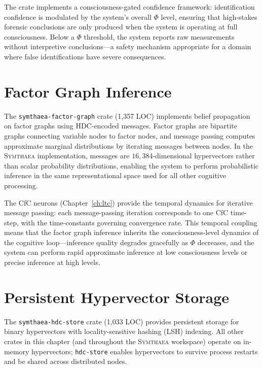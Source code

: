 \documentclass[12pt]{book}
\newcommand{\symthaea}{\textsc{Symthaea}}
\newcommand{\dimHDC}{16{,}384}
\begin{document}
The crate implements a consciousness-gated confidence framework: identification confidence is modulated by the system's overall $\Phi$ level, ensuring that high-stakes forensic conclusions are only produced when the system is operating at full consciousness. Below a $\Phi$ threshold, the system reports raw measurements without interpretive conclusions---a safety mechanism appropriate for a domain where false identifications have severe consequences.

\section{Factor Graph Inference}

The \texttt{symthaea-factor-graph} crate (1,357 LOC) implements belief propagation on factor graphs using HDC-encoded messages. Factor graphs are bipartite graphs connecting variable nodes to factor nodes, and message passing computes approximate marginal distributions by iterating messages between nodes. In the \symthaea{} implementation, messages are $\dimHDC$-dimensional hypervectors rather than scalar probability distributions, enabling the system to perform probabilistic inference in the same representational space used for all other cognitive processing.

The CfC neurons (Chapter~\ref{ch:ltc}) provide the temporal dynamics for iterative message passing: each message-passing iteration corresponds to one CfC time-step, with the time-constants governing convergence rate. This temporal coupling means that the factor graph inference inherits the consciousness-level dynamics of the cognitive loop---inference quality degrades gracefully as $\Phi$ decreases, and the system can perform rapid approximate inference at low consciousness levels or precise inference at high levels.

\section{Persistent Hypervector Storage}

The \texttt{symthaea-hdc-store} crate (1,033 LOC) provides persistent storage for binary hypervectors with locality-sensitive hashing (LSH) indexing. All other crates in this chapter (and throughout the \symthaea{} workspace) operate on in-memory hypervectors; \texttt{hdc-store} enables hypervectors to survive process restarts and be shared across distributed nodes.
\end{document}
